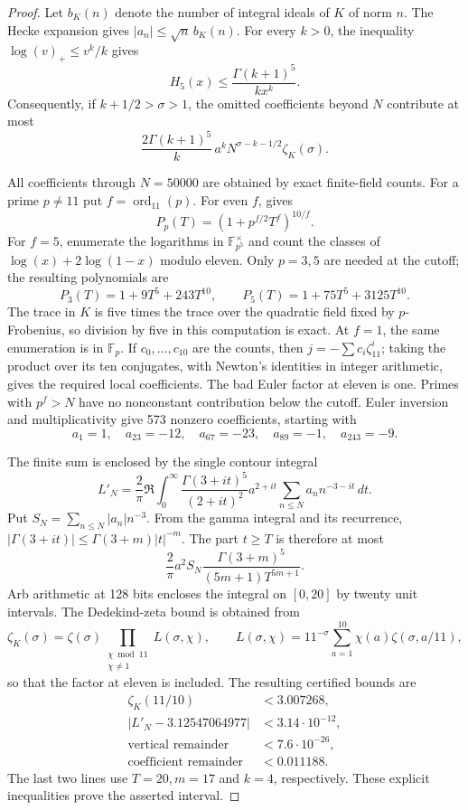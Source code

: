 \begin{proof}
Let $b_K(n)$ denote the number of integral ideals of $K$ of norm $n$.
The Hecke expansion gives $|a_n|\le\sqrt n\,b_K(n)$.  For every
$k>0$, the inequality $\log(v)_+\le v^k/k$ gives
\[
 H_5(x)\le\frac{\Gamma(k+1)^5}{k x^k}.
\]
Consequently, if $k+1/2>\sigma>1$, the omitted coefficients beyond
$N$ contribute at most
\[
 \frac{2\Gamma(k+1)^5}{k}\,a^k
       N^{\sigma-k-1/2}\zeta_K(\sigma).
 \tag{E11a}\label{eq:eleven-rankone-tail}
\]

All coefficients through $N=50000$ are obtained by exact finite-field
counts.  For a prime $p\ne11$ put $f=\operatorname{ord}_{11}(p)$.
For even $f$, \citet[Lemma~1.1, p.~203]{GrossRohrlich1978} gives
\[
 P_p(T)=(1+p^{f/2}T^f)^{10/f}.
\]
For $f=5$, enumerate the logarithms in $\mathbb F_{p^5}^{\times}$
and count the classes of $\log(x)+2\log(1-x)$ modulo eleven.
Only $p=3,5$ are needed at the cutoff; the resulting polynomials are
\[
 P_3(T)=1+9T^5+243T^{10},\qquad
 P_5(T)=1+75T^5+3125T^{10}.
\]
The trace in $K$ is five times the trace over the quadratic field
fixed by $p$-Frobenius, so division by five in this computation is
exact.  At $f=1$, the same enumeration is in $\mathbb F_p$.
If $c_0,\ldots,c_{10}$ are the counts, then
$j=-\sum c_i\zeta_{11}^i$; taking the product over its ten
conjugates, with Newton's identities in integer arithmetic, gives
the required local coefficients.  The bad Euler factor at eleven
is one.  Primes with $p^f>N$ have no nonconstant contribution below
the cutoff.  Euler inversion and multiplicativity give 573 nonzero
coefficients, starting with
\[
 a_1=1,\quad a_{23}=-12,\quad a_{67}=-23,\quad
 a_{89}=-1,\quad a_{243}=-9.
\]

The finite sum is enclosed by the single contour integral
\[
 L'_N=\frac2\pi\Re\int_0^\infty
       \frac{\Gamma(3+it)^5}{(2+it)^2}
       a^{2+it}\sum_{n\le N}a_n n^{-3-it}\,dt.
\]
Put $S_N=\sum_{n\le N}|a_n|n^{-3}$.  From the gamma integral and
its recurrence, $|\Gamma(3+it)|\le\Gamma(3+m)|t|^{-m}$.
The part $t\ge T$ is therefore at most
\[
 \frac2\pi a^2S_N
    \frac{\Gamma(3+m)^5}{(5m+1)T^{5m+1}}.
 \tag{E11b}\label{eq:eleven-rankone-vertical}
\]
Arb arithmetic at 128 bits encloses the integral on $[0,20]$ by
twenty unit intervals.  The Dedekind-zeta bound is obtained from
\[
 \zeta_K(\sigma)=\zeta(\sigma)
       \prod_{\substack{\chi\bmod11\\\chi\ne1}}L(\sigma,\chi),
 \qquad
 L(\sigma,\chi)=11^{-\sigma}\sum_{a=1}^{10}
                   \chi(a)\zeta(\sigma,a/11),
\]
so that the factor at eleven is included.  The resulting certified
bounds are
\[
 \begin{aligned}
 \zeta_K(11/10)&<3.007268,\\
 |L'_N-3.12547064977|&<3.14\cdot10^{-12},\\
 \text{vertical remainder}&<7.6\cdot10^{-26},\\
 \text{coefficient remainder}&<0.011188.
 \end{aligned}
\]
The last two lines use $T=20,m=17$ and $k=4$, respectively.
These explicit inequalities prove the asserted interval.


\end{proof}
